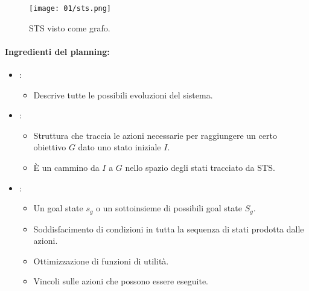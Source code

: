 
\begin{figure}[h]
    \centering
    \texttt{[image: 01/sts.png]}
    \caption{STS visto come grafo.}
\end{figure}

\paragraph{Ingredienti del planning:}

\begin{itemize}
  \item {}: 
    \begin{itemize}
      \item Descrive tutte le possibili evoluzioni del sistema. 
    \end{itemize}
  \item {}:
    \begin{itemize}
      \item Struttura che traccia le azioni necessarie per raggiungere un certo obiettivo $G$ dato uno stato iniziale $I$. 
      \item È un cammino da $I$ a $G$ nello spazio degli stati tracciato da STS.  
    \end{itemize}
  \item {}:
    \begin{itemize}
      \item Un goal state $s_g$ o un sottoinsieme di possibili goal state $S_g$. 
      \item Soddisfacimento di condizioni in tutta la sequenza di stati prodotta dalle azioni. 
      \item Ottimizzazione di funzioni di utilità. 
      \item Vincoli sulle azioni che possono essere eseguite.
    \end{itemize}
\end{itemize}

